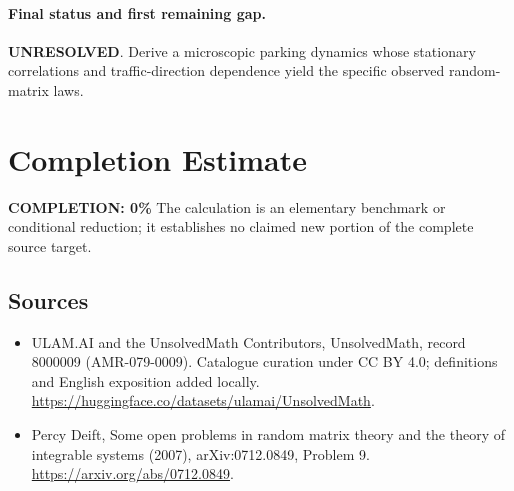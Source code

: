 \documentclass[11pt]{article}
\begin{document}
\paragraph{Final status and first remaining gap.}
\textbf{UNRESOLVED}. Derive a microscopic parking dynamics whose stationary correlations and traffic-direction dependence yield the specific observed random-matrix laws.

\section{Completion Estimate}
\noindent\textbf{COMPLETION: 0\%}
The calculation is an elementary benchmark or conditional reduction; it establishes no claimed new portion of the complete source target.

\subsection{Sources}
\begin{itemize}
\item[\hypertarget{source:8000009:1}{S1}] ULAM.AI and the UnsolvedMath Contributors, UnsolvedMath, record 8000009 (AMR-079-0009). Catalogue curation under CC BY 4.0; definitions and English exposition added locally.
\url{https://huggingface.co/datasets/ulamai/UnsolvedMath}.
\item[\hypertarget{source:8000009:2}{S2}] Percy Deift, Some open problems in random matrix theory and the theory of integrable systems (2007), arXiv:0712.0849, Problem 9.
\url{https://arxiv.org/abs/0712.0849}.
\end{itemize}
\label{end:8000009}
\end{document}
